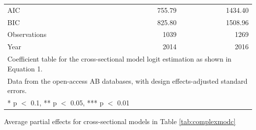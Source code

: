 \documentclass[floatsintext,man]{apa7}\usepackage[]{graphicx}\usepackage[]{color}
\begin{document}
\begin{longtable}[t]{lrr}
\midrule
AIC & \num{755.79} & \num{1434.40}\\
BIC & \num{825.80} & \num{1508.96}\\
Observations & 1039 & 1269\\
Year & 2014 & 2016\\
\bottomrule
\multicolumn{3}{l}{\rule{0pt}{1em}Coefficient table for the cross-sectional model logit estimation as shown in Equation 1.}\\
\multicolumn{3}{l}{\rule{0pt}{1em}Data from the open-access AB databases, with design effects-adjusted standard errors.}\\
\multicolumn{3}{l}{\rule{0pt}{1em}* p $<$ 0.1, ** p $<$ 0.05, *** p $<$ 0.01}\\
\end{longtable}


\begin{table}[htbp]
\begin{center}
\caption{Average partial effects for cross-sectional models in Table \ref{tab:complexmodc}}
\label{tab:apecross}
\renewcommand{\arraystretch}{1}


\end{center}
\end{table}
\end{document}
